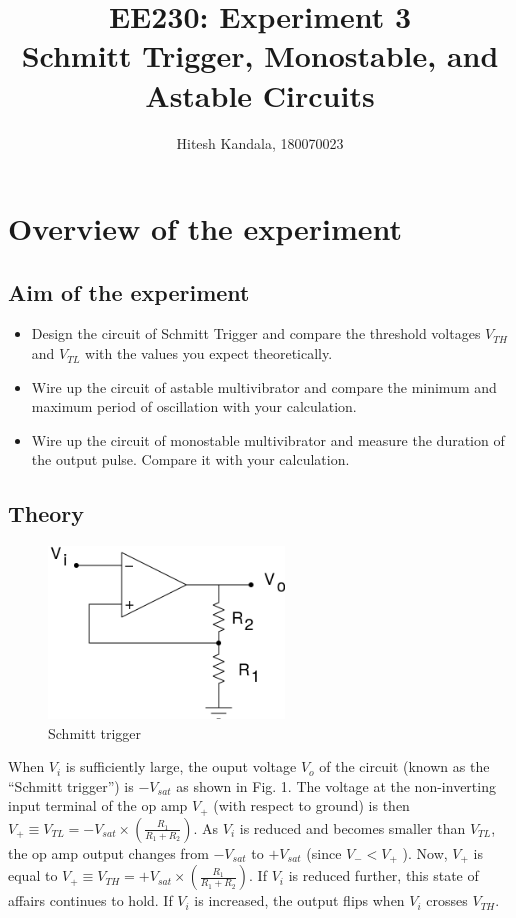 \documentclass[12pt]{article}
\title{EE230: Experiment 3\\
Schmitt Trigger, Monostable, and Astable Circuits}
\author{Hitesh Kandala, 180070023}
\begin{document}
\maketitle

\section{Overview of the experiment}

\subsection{Aim of the experiment}
\begin{itemize}
    \item Design the circuit of Schmitt Trigger and compare the threshold voltages $V_{TH}$  and $V_{TL}$ with the values you expect theoretically. 
    \item Wire up the circuit of astable multivibrator and compare the minimum and maximum period of oscillation with your calculation.
    \item Wire up the circuit of monostable multivibrator and measure the duration of the output pulse. Compare it with your calculation.
\end{itemize}

\subsection{Theory} 
        \begin{figure}[H]
            \centering
            \includegraphics[width = 0.4\linewidth, height = 1.8in]{reports/lab2/non.png}
            \caption{Schmitt trigger}
        \end{figure}
When $V_i$ is sufficiently large, the ouput voltage $V_o$ of the circuit (known as the “Schmitt trigger”) is $−V_{sat}$ as shown in Fig. 1. The voltage at the non-inverting input terminal of the op amp $V_+$ (with respect to ground) is then $V_+ \equiv V_{TL} = −V_{sat}\times(\frac{R_1}{R_1+R_2})$. As $V_i$ is reduced and becomes smaller than $V_{TL}$, the op amp output changes from $-V_{sat}$ to $+V_{sat}$ (since $V_- < V_+$ ). Now, $V_+$ is equal to $V_+ \equiv V_{TH} = +V_{sat}\times(\frac{R_1}{R_1+R_2})$. If $V_i$ is reduced further, this state of affairs continues to hold. If $V_i$ is increased, the output flips when $V_i$ crosses $V_{TH}$.
\end{document}
